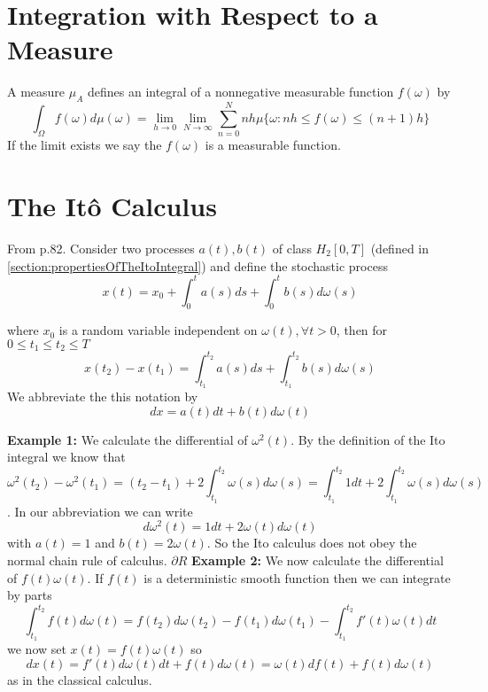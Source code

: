 \documentclass[12pt]{book}
\begin{document}
\section{Integration with Respect to a Measure}
A measure $\mu_A$ defines an integral of a nonnegative measurable function $f(\omega)$ by 
\begin{equation*}
\int_{\Omega}f(\omega)d\mu(\omega)=\lim_{h\rightarrow 0}\lim_{N\rightarrow \infty}\sum_{n=0}^{N}nh\mu\{\omega: nh\leq f(\omega)\leq(n+1)h\}
\end{equation*}
If the limit exists we say the $f(\omega)$ is a measurable function. 


\section{The It\^{o} Calculus}\label{section:theItoCalculus}
From \cite{schuss2009theory} p.82. Consider two processes $a(t),b(t)$ of class $H_2[0,T]$ (defined in \ref{section:propertiesOfTheItoIntegral}) and define the stochastic process
\begin{equation*}
x(t) = x_0 + \int_0^t a(s)ds + \int_0^t b(s)d\omega(s)
\end{equation*}

where $x_0$ is a random variable independent on $\omega(t),\forall t>0$, then for $0\leq t_1\leq t_2 \leq T$
\begin{equation*}
x(t_2)-x(t_1)=\int_{t_1}^{t_2}a(s)ds +\int_{t_1}^{t_2}b(s)d\omega(s)
\end{equation*}
We abbreviate the this notation by 
\begin{equation*}
dx=a(t)dt+b(t)d\omega(t)
\end{equation*}

\textbf{Example 1:} We calculate the differential of $\omega^2(t)$. By the definition of the Ito integral we know that 
\begin{equation*}
\omega^2(t_2)-\omega^2(t_1)=(t_2-t_1)+2\int_{t_1}^{t_2}\omega(s)d\omega(s)=\int_{t_1}^{t_2}1dt+2\int_{t_1}^{t_2}\omega(s)d\omega(s)
\end{equation*}. 
In our abbreviation we can write 
\begin{equation*}
d\omega^2(t) = 1dt+2\omega(t)d\omega(t)
\end{equation*}
with $a(t)=1$ and $b(t)=2\omega(t)$. So the Ito calculus does not obey the normal chain rule of calculus.
$\partial R$
\textbf{Example 2:} We now calculate the differential of $f(t)\omega(t)$. If $f(t)$ is a deterministic smooth function then we can integrate by parts
\begin{equation*}
\int_{t_1}^{t_2}f(t)d\omega(t)= f(t_2)d\omega(t_2)-f(t_1)d\omega(t_1)-\int_{t_1}^{t_2}f'(t)\omega(t)dt
\end{equation*}
we now set $x(t)= f(t)\omega(t)$ so 
\begin{equation*}
dx(t) = f'(t)d\omega(t)dt+f(t)d\omega(t)=\omega(t)df(t)+f(t)d\omega(t)
\end{equation*}
as in the classical calculus. 
\end{document}
